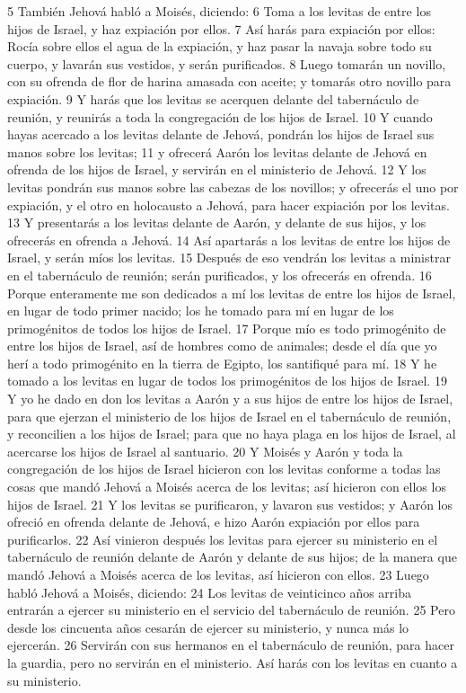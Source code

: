 5 También Jehová habló a Moisés, diciendo:
6 Toma a los levitas de entre los hijos de Israel, y haz expiación por ellos.
7 Así harás para expiación por ellos: Rocía sobre ellos el agua de la expiación, y haz pasar la navaja sobre todo su cuerpo, y lavarán sus vestidos, y serán purificados.
8 Luego tomarán un novillo, con su ofrenda de flor de harina amasada con aceite; y tomarás otro novillo para expiación.
9 Y harás que los levitas se acerquen delante del tabernáculo de reunión, y reunirás a toda la congregación de los hijos de Israel.
10 Y cuando hayas acercado a los levitas delante de Jehová, pondrán los hijos de Israel sus manos sobre los levitas;
11 y ofrecerá Aarón los levitas delante de Jehová en ofrenda de los hijos de Israel, y servirán en el ministerio de Jehová.
12 Y los levitas pondrán sus manos sobre las cabezas de los novillos; y ofrecerás el uno por expiación, y el otro en holocausto a Jehová, para hacer expiación por los levitas.
13 Y presentarás a los levitas delante de Aarón, y delante de sus hijos, y los ofrecerás en ofrenda a Jehová.
14 Así apartarás a los levitas de entre los hijos de Israel, y serán míos los levitas.
15 Después de eso vendrán los levitas a ministrar en el tabernáculo de reunión; serán purificados, y los ofrecerás en ofrenda.
16 Porque enteramente me son dedicados a mí los levitas de entre los hijos de Israel, en lugar de todo primer nacido; los he tomado para mí en lugar de los primogénitos de todos los hijos de Israel.
17 Porque mío es todo primogénito de entre los hijos de Israel, así de hombres como de animales; desde el día que yo herí a todo primogénito en la tierra de Egipto, los santifiqué para mí.
18 Y he tomado a los levitas en lugar de todos los primogénitos de los hijos de Israel.
19 Y yo he dado en don los levitas a Aarón y a sus hijos de entre los hijos de Israel, para que ejerzan el ministerio de los hijos de Israel en el tabernáculo de reunión, y reconcilien a los hijos de Israel; para que no haya plaga en los hijos de Israel, al acercarse los hijos de Israel al santuario.
20 Y Moisés y Aarón y toda la congregación de los hijos de Israel hicieron con los levitas conforme a todas las cosas que mandó Jehová a Moisés acerca de los levitas; así hicieron con ellos los hijos de Israel.
21 Y los levitas se purificaron, y lavaron sus vestidos; y Aarón los ofreció en ofrenda delante de Jehová, e hizo Aarón expiación por ellos para purificarlos.
22 Así vinieron después los levitas para ejercer su ministerio en el tabernáculo de reunión delante de Aarón y delante de sus hijos; de la manera que mandó Jehová a Moisés acerca de los levitas, así hicieron con ellos.
23 Luego habló Jehová a Moisés, diciendo:
24 Los levitas de veinticinco años arriba entrarán a ejercer su ministerio en el servicio del tabernáculo de reunión.
25 Pero desde los cincuenta años cesarán de ejercer su ministerio, y nunca más lo ejercerán.
26 Servirán con sus hermanos en el tabernáculo de reunión, para hacer la guardia, pero no servirán en el ministerio. Así harás con los levitas en cuanto a su ministerio.

